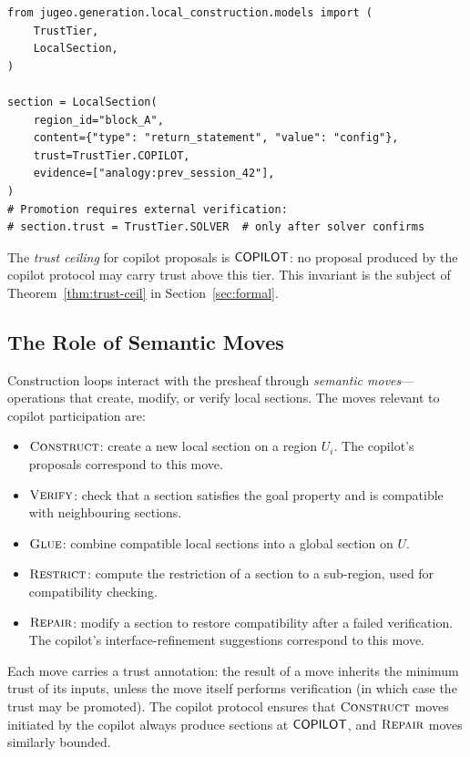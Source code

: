 \documentclass[11pt]{article}
\begin{document}
\begin{lstlisting}
from jugeo.generation.local_construction.models import (
    TrustTier,
    LocalSection,
)

section = LocalSection(
    region_id="block_A",
    content={"type": "return_statement", "value": "config"},
    trust=TrustTier.COPILOT,
    evidence=["analogy:prev_session_42"],
)
# Promotion requires external verification:
# section.trust = TrustTier.SOLVER  # only after solver confirms
\end{lstlisting}

The \emph{trust ceiling} for copilot proposals is $\mathsf{COPILOT}$: no
proposal produced by the copilot protocol may carry trust above this
tier.  This invariant is the subject of Theorem~\ref{thm:trust-ceil}
in Section~\ref{sec:formal}.

\subsection{The Role of Semantic Moves}\label{sec:bg-moves}

Construction loops interact with the presheaf through
\emph{semantic moves}---operations that create, modify, or verify
local sections.  The moves relevant to copilot participation are:

\begin{itemize}
  \item $\textsc{Construct}$: create a new local section on a region $U_i$.
        The copilot's proposals correspond to this move.
  \item $\textsc{Verify}$: check that a section satisfies the goal property
        and is compatible with neighbouring sections.
  \item $\textsc{Glue}$: combine compatible local sections into a global
        section on $U$.
  \item $\textsc{Restrict}$: compute the restriction of a section to a
        sub-region, used for compatibility checking.
  \item $\textsc{Repair}$: modify a section to restore compatibility after
        a failed verification.  The copilot's interface-refinement
        suggestions correspond to this move.
\end{itemize}

Each move carries a trust annotation: the result of a move inherits
the minimum trust of its inputs, unless the move itself performs
verification (in which case the trust may be promoted).  The copilot
protocol ensures that $\textsc{Construct}$ moves initiated by the copilot
always produce sections at $\mathsf{COPILOT}$, and $\textsc{Repair}$ moves
similarly bounded.
\end{document}
